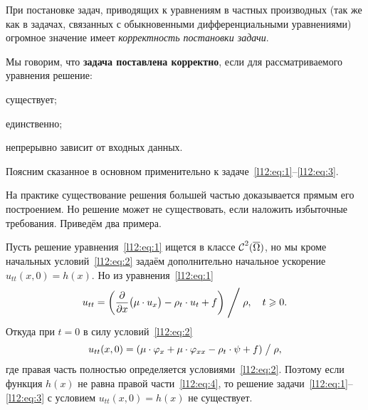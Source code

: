 При постановке задач, приводящих к уравнениям в частных производных (так же как в задачах, связанных с обыкновенными дифференциальными уравнениями) огромное значение имеет \emph{корректность постановки задачи}.
\begin{_def}
	Мы говорим, что \textbf{задача поставлена корректно}, если для рассматриваемого уравнения решение:
	\begin{enumerateD}
		\item существует;
		\item единственно;
		\item непрерывно зависит от входных данных.
	\end{enumerateD} 
\end{_def}
\noindent Поясним сказанное в основном применительно к задаче~\eqref{l12:eq:1}--\eqref{l12:eq:3}.
\begin{enumerateD}
	\item На практике существование решения большей частью доказывается прямым его построением. Но решение может не существовать, если наложить избыточные требования. Приведём два примера.
	\begin{enumerateD}
		\item Пусть решение уравнения~\eqref{l12:eq:1} ищется в классе $\mathcal{C}{\mathstrut}^{2}_{}(\overline{\Omega})$, но мы кроме начальных условий~\eqref{l12:eq:2} задаём дополнительно начальное ускорение $u_{tt}(x,0)=h(x)$. Но из уравнения~\eqref{l12:eq:1}
		\begin{equation*}
			u_{tt}=\left(\frac{\partial}{\partial x}\big(\mu\cdot u_x\big)-\rho_t\cdot u_t+f\right)\Biggm/\rho,\quad t\geqslant0.
		\end{equation*}
		Откуда при $t=0$ в силу условий~\eqref{l12:eq:2}
		\begin{equation}
			\label{l12:eq:4}
			u_{tt}(x,0)=\left(\mu\cdot\phi_x+\mu\cdot\phi_{xx}-\rho_t\cdot\psi+f\right)\bigm/\rho,
		\end{equation}
		где правая часть полностью определяется условиями~\eqref{l12:eq:2}. Поэтому если функция $h(x)$ не равна правой части~\eqref{l12:eq:4}, то решение задачи~\eqref{l12:eq:1}--\eqref{l12:eq:3} с условием $u_{tt}(x,0)=h(x)$ не существует.
		

\end{enumerateD}
\end{enumerateD}

